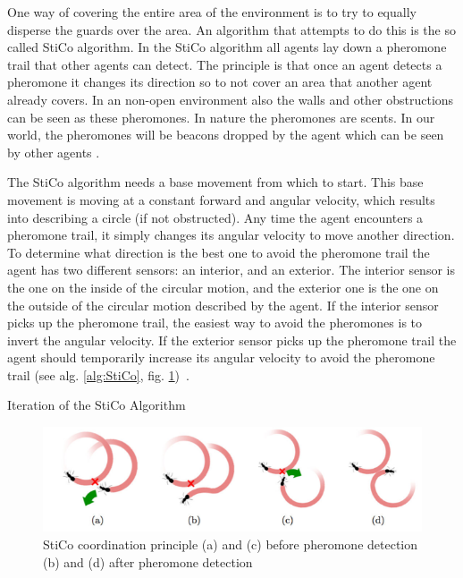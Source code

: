 
One way of covering the entire area of the environment is to try to equally disperse the guards over the area. An algorithm that attempts to do this is the so called StiCo algorithm. In the StiCo algorithm all agents lay down a pheromone trail that other agents can detect. The principle is that once an agent detects a pheromone it changes its direction so to not cover an area that another agent already covers. In an non-open environment also the walls and other obstructions can be seen as these pheromones. In nature the pheromones are scents. In our world, the pheromones will be beacons dropped by the agent which can be seen by other agents \cite{ranjbar2012multi}.

The StiCo algorithm needs a base movement from which to start. This base movement is moving at a constant forward and angular velocity, which results into describing a circle (if not obstructed). Any time the agent encounters a pheromone trail, it simply changes its angular velocity to move another direction. To determine what direction is the best one to avoid the pheromone trail the agent has two different sensors: an interior, and an exterior. The interior sensor is the one on the inside of the circular motion, and the exterior one is the one on the outside of the circular motion described by the agent. If the interior sensor picks up the pheromone trail, the easiest way to avoid the pheromones is to invert the angular velocity. If the exterior sensor picks up the pheromone trail the agent should temporarily increase its angular velocity to avoid the pheromone trail (see alg. \ref{alg:StiCo}, fig. \ref{fig:movingDirections})~\cite{ranjbar2012multi}.

\begin{algorithm}
\label{alg:StiCo}
\caption{Iteration of the StiCo Algorithm~\protect\cite{ranjbar2012multi}}
\end{algorithm}

\begin{figure}
\centering
\includegraphics[width=\columnwidth]{images/stico.png}
\caption{StiCo coordination principle (a) and (c) before pheromone detection (b) and (d) after pheromone detection~\protect\cite{ranjbar2012multi}}
\label{fig:movingDirections}
\end{figure}

